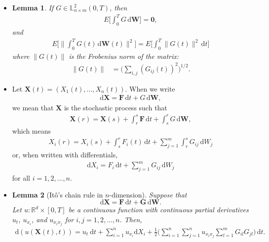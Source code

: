\documentclass[10pt]{article}
\newtheorem{lemma}{Lemma}
\newcommand{\dee}{\mathrm{d}}
\newcommand{\ve}[1]{\mathbf{#1}}
\newcommand{\Real}{\mathbb{R}}
\begin{document}
\begin{itemize}
  \item \begin{lemma}
    If $G \in \mathbb{L}_{n\times m}^2(0,T)$, then
    \begin{align*}
      E\bigg[ \int_0^T G\, \dee\ve{W} \bigg] = \ve{0},
    \end{align*}
    and
    \begin{align*}
      E\bigg[ \bigg\| \int_0^T G(t)\, \dee\ve{W}(t) \bigg\|^2 \bigg]
      = E\bigg[ \int_0^T \| G(t) \|^2\, \dee t \bigg]
    \end{align*}
    where $\| G(t) \|$ is the Frobenius norm of the matrix:
    \begin{align*}
      \| G(t) \| &= \bigg( \sum_{i,j} (G_{ij}(t))^2 \bigg)^{1/2}.
    \end{align*}
  \end{lemma}

  \item Let $\ve{X}(t) = (X_1(t), \dotsc, X_n(t))$. When we write
  \begin{align*}
    \dee \ve{X} = \ve{F}\, \dee t + G\, \dee \ve{W},    
  \end{align*}
  we mean that $\ve{X}$ is the stochastic process such that
  \begin{align*}
    \ve{X}(r) = \ve{X}(s) + \int_r^s \ve{F}\, \dee t + \int_s^r G\, \dee \ve{W},
  \end{align*}
  which means
  \begin{align*}
    X_i(r) = X_i(s) + \int_s^r F_i(t)\, \dee t + \sum_{j=1}^m \int_{r}^s G_{ij}\, \dee W_j
  \end{align*}
  or, when written with differentials,
  \begin{align*}
    \dee X_i = F_i\, \dee t + \sum_{j=1}^m G_{ij}\, \dee W_j
  \end{align*}
  for all $i = 1, 2, \dotsc, n$.

  \item \begin{lemma}[It\^{o}'s chain rule in $n$-dimension]
    Suppose that $$\dee \ve{X} = \ve{F}\, \dee t + \ve{G}\, \dee\ve{W}.$$ Let $u : \Real^d \times [0,T]$ be a continuous function with continuous partial derivatives $u_t$, $u_{x_i}$, and $u_{x_i x_j}$ for $i,j = 1, 2, \dotsc, n$. Then,
    \begin{align*}
      \dee(u(\ve{X}(t), t)) = u_t\ \dee t + \sum_{i=1}^n u_{x_i}\dee X_i + \frac{1}{2} \bigg( \sum_{i=1}^n \sum_{j=1}^n u_{x_i x_j} \sum_{l=1}^m G_{il}G_{jl} \bigg)\, \dee t.
    \end{align*}
  \end{lemma}


\end{itemize}
\end{document}
